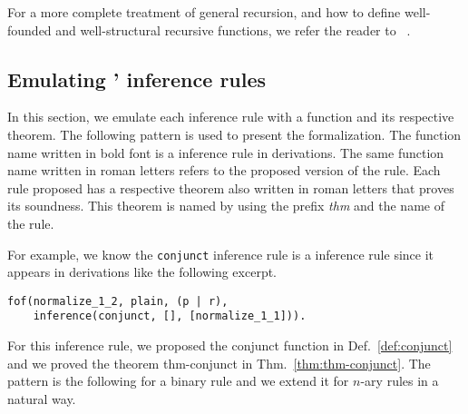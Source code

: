 \documentclass[../main.tex]{subfiles}
\begin{document}
For a more complete treatment of general recursion, and how to
define well-founded and well-structural recursive functions, we refer
the reader to \citeauthor{Bove2005}~\cite{Bove2005}.


\subsection{Emulating \Metis' inference rules}
\label{ssec:emulating-inferences}

In this section, we emulate each \Metis inference rule with a
function and its respective theorem.
The following pattern is used to present the formalization.
The function name written in bold font
is a \Metis inference rule in \TSTP derivations.
The same function name written in roman letters refers to the proposed
version of the rule.
Each rule proposed has a respective theorem also written in roman letters
that proves its soundness.
This theorem is named by using the prefix \emph{thm}
and the name of the rule.

For example, we know the \verb!conjunct! inference rule is a
\Metis inference rule since it appears in \TSTP derivations like
the following excerpt.

\begin{verbatim}
fof(normalize_1_2, plain, (p | r),
    inference(conjunct, [], [normalize_1_1])).
\end{verbatim}

For this inference rule, we proposed the \rm{conjunct} function in
Def.~\ref{def:conjunct} and we proved the theorem \rm{thm-conjunct}
in Thm.~\ref{thm:thm-conjunct}. The pattern is the following for
a binary rule and we extend it for $n$-ary rules in a natural way.
\end{document}
